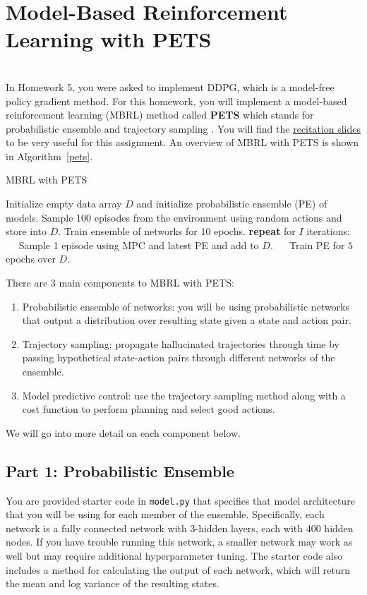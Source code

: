 \documentclass[12pt]{article}
\begin{document}
\section*{Model-Based Reinforcement Learning with PETS}
\ \\
In Homework 5, you were asked to implement DDPG, which is a model-free policy gradient method.  For this homework, you will implement a model-based reinforcement learning (MBRL) method called \textbf{PETS} which stands for probabilistic ensemble and trajectory sampling \cite{chua2018deep}.  You will find the \href{https://docs.google.com/presentation/d/11rnA45La8JbuI1IvxWAZqOcwZ5oYfiInGYquOTZmWzc/edit?usp=sharing}{recitation slides} to be very useful for this assignment.  An overview of MBRL with PETS is shown in Algorithm~\ref{pets}.

\begin{algorithm}
\caption{MBRL with PETS\label{pets}}
\begin{algorithmic}[1]
\State Initialize empty data array $D$ and initialize probabilistic ensemble (PE) of models.
\State Sample 100 episodes from the environment using random actions and store into $D$. 
\State Train ensemble of networks for 10 epochs.
\State \textbf{repeat} for $I$ iterations:
\State $\quad$ Sample 1 episode using MPC and latest PE and add to $D$.
\State $\quad$ Train PE for $5$ epochs over $D$.
\EndProcedure
\end{algorithmic}
\end{algorithm}

There are 3 main components to MBRL with PETS: 
\begin{enumerate}
    \item Probabilistic ensemble of networks: you will be using probabilistic networks that output a distribution over resulting state given a state and action pair.  
    \item Trajectory sampling: propagate hallucinated trajectories through time by passing hypothetical state-action pairs through different networks of the ensemble.  
    \item Model predictive control: use the trajectory sampling method along with a cost function to perform planning and select good actions.
\end{enumerate}

We will go into more detail on each component below. 

\subsection*{Part 1: Probabilistic Ensemble}
You are provided starter code in \texttt{model.py} that specifies that model architecture that you will be using for each member of the ensemble.  Specifically, each network is a fully connected network with 3-hidden layers, each with 400 hidden nodes.  If you have trouble running this network, a smaller network may work as well but may require additional hyperparameter tuning.  The starter code also includes a method for calculating the output of each network, which will return the mean and log variance of the resulting states.  
\end{document}
